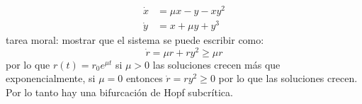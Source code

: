\begin{ejemplo}
	\begin{align*}
	  \dot{x} &= \mu x - y - xy^2 \\
	  \dot{y} &= x + \mu y + y^3 
	\end{align*}
	tarea moral: mostrar que el sistema se puede escribir como: 
	\begin{equation*}
	  \dot{r} = \mu r + r y^2 \ge \mu r 
	\end{equation*}
	por lo que $r(t)=r_0e^{\mu t}$
	si $ \mu>0$ las soluciones crecen más que exponencialmente, si $ \mu=0$ entonces $\dot{r}=ry^2 \ge 0$ por lo que las soluciones crecen. Por lo tanto hay una bifurcación de Hopf subcrítica.

\begin{figure}[H]
 \centering
\end{figure}
\end{ejemplo}

                    
